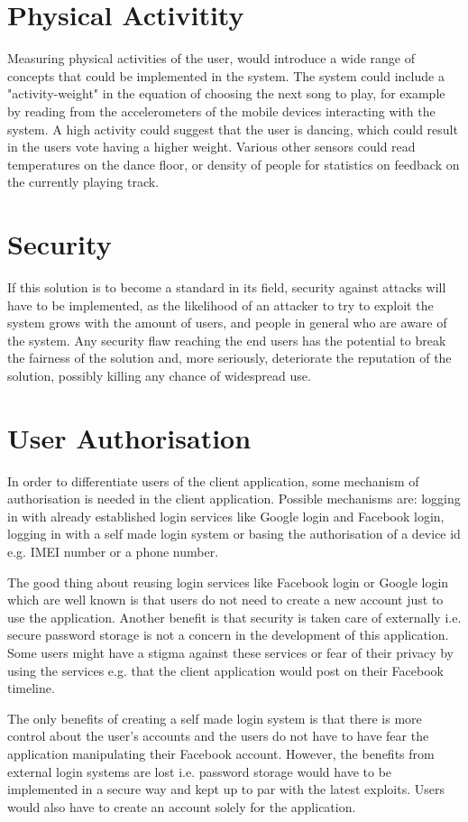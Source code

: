 \section{Physical Activitity}
Measuring physical activities of the user, would introduce a wide
range of concepts that could be implemented in the system. The system
could include a "activity-weight" in the equation of choosing the next
song to play, for example by reading from the accelerometers of the
mobile devices interacting with the system. A high activity could
suggest that the user is dancing, which could result in the users vote
having a higher weight. Various other sensors could read temperatures
on the dance floor, or density of people for statistics on feedback
on the currently playing track.

\section{Security}
If this solution is to become a standard in its field, security against attacks will have to be implemented, as the likelihood of an attacker to try to exploit the system grows with the amount of users, and people in general who are aware of the system. Any security flaw reaching the end users has the potential to break the fairness of the solution and, more seriously, deteriorate the reputation of the solution, possibly killing any chance of widespread use.

\section{User Authorisation}\label{sec:UAuth}
In order to differentiate users of the client application, some mechanism of authorisation is needed in the client application. Possible mechanisms are: logging in with already established login services like Google login and Facebook login, logging in with a self made login system or basing the authorisation of a device id e.g. IMEI number or a phone number.

The good thing about reusing login services like Facebook login or Google login which are well known is that users do not need to create a new account just to use the application. Another benefit is that security is taken care of externally i.e. secure password storage is not a concern in the development of this application. Some users might have a stigma against these services or fear of their privacy by using the services e.g. that the client application would post on their Facebook timeline.

The only benefits of creating a self made login system is that there is more control about the user's accounts and the users do not have to have fear the application manipulating their Facebook account. However, the benefits from external login systems are lost i.e. password storage would have to be implemented in a secure way and kept up to par with the latest exploits. Users would also have to create an account solely for the application.

